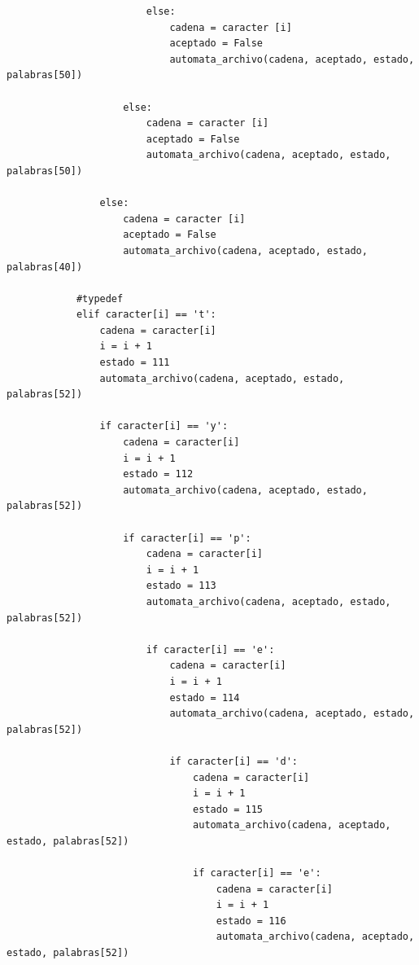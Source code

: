 \documentclass{article}
\begin{document}
\begin{flushleft}
\begin{lstlisting}
                        else:
                            cadena = caracter [i]
                            aceptado = False
                            automata_archivo(cadena, aceptado, estado, palabras[50])
                        
                    else:
                        cadena = caracter [i]
                        aceptado = False
                        automata_archivo(cadena, aceptado, estado, palabras[50])
                
                else:
                    cadena = caracter [i]
                    aceptado = False
                    automata_archivo(cadena, aceptado, estado, palabras[40])
                
            #typedef
            elif caracter[i] == 't':
                cadena = caracter[i]
                i = i + 1
                estado = 111
                automata_archivo(cadena, aceptado, estado, palabras[52])
                    
                if caracter[i] == 'y':
                    cadena = caracter[i]
                    i = i + 1
                    estado = 112
                    automata_archivo(cadena, aceptado, estado, palabras[52])
                        
                    if caracter[i] == 'p':
                        cadena = caracter[i]
                        i = i + 1
                        estado = 113
                        automata_archivo(cadena, aceptado, estado, palabras[52])
                            
                        if caracter[i] == 'e':
                            cadena = caracter[i]
                            i = i + 1
                            estado = 114
                            automata_archivo(cadena, aceptado, estado, palabras[52])
                                
                            if caracter[i] == 'd':
                                cadena = caracter[i]
                                i = i + 1
                                estado = 115
                                automata_archivo(cadena, aceptado, estado, palabras[52])
                                    
                                if caracter[i] == 'e':
                                    cadena = caracter[i]
                                    i = i + 1
                                    estado = 116
                                    automata_archivo(cadena, aceptado, estado, palabras[52])
                                    

\end{lstlisting}
\end{flushleft}
\end{document}
